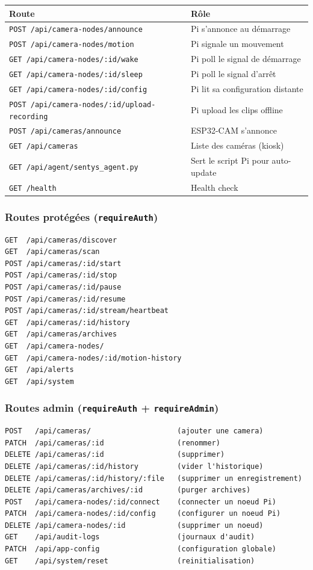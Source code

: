 \documentclass[12pt,a4paper]{article}
\begin{document}
\begin{longtable}{|l|p{9cm}|}
\hline
\textbf{Route} & \textbf{Rôle} \\
\hline
\endhead
\hline
\endfoot
\texttt{POST /api/camera-nodes/announce} & Pi s'annonce au démarrage \\
\texttt{POST /api/camera-nodes/motion} & Pi signale un mouvement \\
\texttt{GET /api/camera-nodes/:id/wake} & Pi poll le signal de démarrage \\
\texttt{GET /api/camera-nodes/:id/sleep} & Pi poll le signal d'arrêt \\
\texttt{GET /api/camera-nodes/:id/config} & Pi lit sa configuration distante \\
\texttt{POST /api/camera-nodes/:id/upload-recording} & Pi upload les clips offline \\
\texttt{POST /api/cameras/announce} & ESP32-CAM s'annonce \\
\texttt{GET /api/cameras} & Liste des caméras (kiosk) \\
\texttt{GET /api/agent/sentys\_agent.py} & Sert le script Pi pour auto-update \\
\texttt{GET /health} & Health check \\
\hline
\end{longtable}

\subsubsection{Routes protégées (\texttt{requireAuth})}

\begin{lstlisting}
GET  /api/cameras/discover
GET  /api/cameras/scan
POST /api/cameras/:id/start
POST /api/cameras/:id/stop
POST /api/cameras/:id/pause
POST /api/cameras/:id/resume
POST /api/cameras/:id/stream/heartbeat
GET  /api/cameras/:id/history
GET  /api/cameras/archives
GET  /api/camera-nodes/
GET  /api/camera-nodes/:id/motion-history
GET  /api/alerts
GET  /api/system
\end{lstlisting}

\subsubsection{Routes admin (\texttt{requireAuth} + \texttt{requireAdmin})}

\begin{lstlisting}
POST   /api/cameras/                    (ajouter une camera)
PATCH  /api/cameras/:id                 (renommer)
DELETE /api/cameras/:id                 (supprimer)
DELETE /api/cameras/:id/history         (vider l'historique)
DELETE /api/cameras/:id/history/:file   (supprimer un enregistrement)
DELETE /api/cameras/archives/:id        (purger archives)
POST   /api/camera-nodes/:id/connect    (connecter un noeud Pi)
PATCH  /api/camera-nodes/:id/config     (configurer un noeud Pi)
DELETE /api/camera-nodes/:id            (supprimer un noeud)
GET    /api/audit-logs                  (journaux d'audit)
PATCH  /api/app-config                  (configuration globale)
GET    /api/system/reset                (reinitialisation)
\end{lstlisting}
\end{document}
